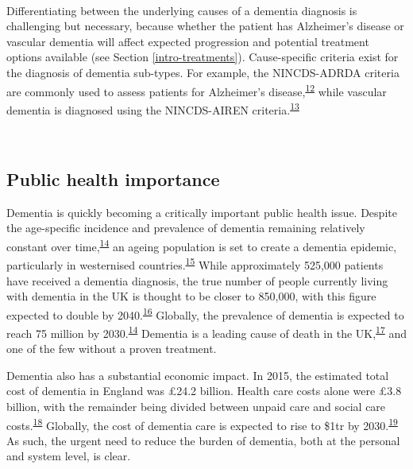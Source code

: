 \documentclass[a4paper, twoside]{templates/ociamthesis}
\begin{document}
~

Differentiating between the underlying causes of a dementia diagnosis is challenging but necessary, because whether the patient has Alzheimer's disease or vascular dementia will affect expected progression and potential treatment options available (see Section \ref{intro-treatments}). Cause-specific criteria exist for the diagnosis of dementia sub-types. For example, the NINCDS-ADRDA criteria are commonly used to assess patients for Alzheimer's disease,\textsuperscript{\protect\hyperlink{ref-dubois2007}{12}} while vascular dementia is diagnosed using the NINCDS-AIREN criteria.\textsuperscript{\protect\hyperlink{ref-roman1993}{13}}

~

\hypertarget{public-health-importance}{%
\subsection{Public health importance}\label{public-health-importance}}

Dementia is quickly becoming a critically important public health issue. Despite the age-specific incidence and prevalence of dementia remaining relatively constant over time,\textsuperscript{\protect\hyperlink{ref-prince2016}{14}} an ageing population is set to create a dementia epidemic, particularly in westernised countries.\textsuperscript{\protect\hyperlink{ref-flier2005}{15}} While approximately 525,000 patients have received a dementia diagnosis, the true number of people currently living with dementia in the UK is thought to be closer to 850,000, with this figure expected to double by 2040.\textsuperscript{\protect\hyperlink{ref-baker2019}{16}} Globally, the prevalence of dementia is expected to reach 75 million by 2030.\textsuperscript{\protect\hyperlink{ref-prince2016}{14}} Dementia is a leading cause of death in the UK,\textsuperscript{\protect\hyperlink{ref-zotero-15757}{17}} and one of the few without a proven treatment.

Dementia also has a substantial economic impact. In 2015, the estimated total cost of dementia in England was £24.2 billion. Health care costs alone were £3.8 billion, with the remainder being divided between unpaid care and social care costs.\textsuperscript{\protect\hyperlink{ref-wittenberg2019}{18}} Globally, the cost of dementia care is expected to rise to \$1tr by 2030.\textsuperscript{\protect\hyperlink{ref-prince2014}{19}} As such, the urgent need to reduce the burden of dementia, both at the personal and system level, is clear.
\end{document}
